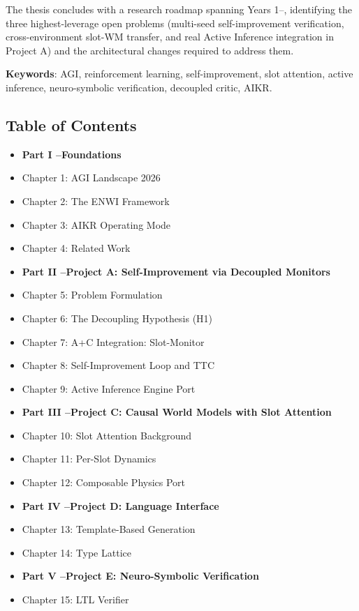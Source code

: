 \documentclass[11pt]{article}
\begin{document}
The thesis concludes with a research roadmap spanning Years 1--, identifying the
three highest-leverage open problems (multi-seed self-improvement verification,
cross-environment slot-WM transfer, and real Active Inference integration in
Project A) and the architectural changes required to address them.

\textbf{Keywords}: AGI, reinforcement learning, self-improvement, slot attention, active
inference, neuro-symbolic verification, decoupled critic, AIKR.

\hrulefill

\subsection{Table of Contents}

\begin{itemize}
  \item \textbf{Part I --Foundations}
  \item Chapter 1: AGI Landscape 2026
  \item Chapter 2: The ENWI Framework
  \item Chapter 3: AIKR Operating Mode
  \item Chapter 4: Related Work
  \item \textbf{Part II --Project A: Self-Improvement via Decoupled Monitors}
  \item Chapter 5: Problem Formulation
  \item Chapter 6: The Decoupling Hypothesis (H1)
  \item Chapter 7: A+C Integration: Slot-Monitor
  \item Chapter 8: Self-Improvement Loop and TTC
  \item Chapter 9: Active Inference Engine Port
  \item \textbf{Part III --Project C: Causal World Models with Slot Attention}
  \item Chapter 10: Slot Attention Background
  \item Chapter 11: Per-Slot Dynamics
  \item Chapter 12: Composable Physics Port
  \item \textbf{Part IV --Project D: Language Interface}
  \item Chapter 13: Template-Based Generation
  \item Chapter 14: Type Lattice
  \item \textbf{Part V --Project E: Neuro-Symbolic Verification}
  \item Chapter 15: LTL Verifier

\end{itemize}
\end{document}
